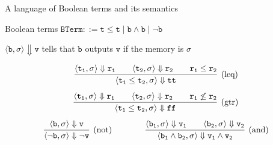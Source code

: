 \documentclass{beamer}
\begin{document}
\begin{frame}{A language of Boolean terms and its semantics}

        \begin{block}{Boolean terms}
        $\mathtt{BTerm} ::= \mathtt{t \leq t} \mid \mathtt{b \wedge b}
        \mid \mathtt{\neg b}$
	\end{block}
        $\langle \mathtt{b},\sigma \rangle \Downarrow
        \mathtt{v}$ tells that $\mathtt{b}$ outputs
        $\mathtt{v}$ if the memory is $\sigma$

        \[
                \infer[(\text{leq})]
                { 
                        \langle \mathtt{t_1 \leq t_2}, \sigma \rangle \Downarrow \mathtt{tt} 
                }
                {
                        \langle \mathtt{t_1}, \sigma \rangle \Downarrow \mathtt{r_1} \qquad
                        \langle \mathtt{t_2}, \sigma \rangle \Downarrow \mathtt{r_2}
                        \qquad \mathtt{r_1 \leq r_2}
                } 
        \] 
        \vspace{0.1cm}
        \[
                \infer[(\text{gtr})]
                { 
                        \langle \mathtt{t_1 \leq t_2}, \sigma \rangle \Downarrow \mathtt{ff} 
                }
                {
                        \langle \mathtt{t_1}, \sigma \rangle \Downarrow \mathtt{r_1} \qquad
                        \langle \mathtt{t_2}, \sigma \rangle \Downarrow \mathtt{r_2}
                        \qquad \mathtt{r_1 \not \leq r_2}
                }
        \]
        \vspace{0.1cm}
        \[        
                \infer[(\text{not})]{  
                        \langle \mathtt{\neg \mathtt{b}}, \sigma \rangle \Downarrow 
                        \mathtt{\neg v}
                        }{
                        \langle \mathtt{b}, \sigma \rangle \Downarrow \mathtt{v}
                } \qquad \qquad
                \infer[(\text{and})]{  
                        \langle \mathtt{b_1} \wedge \mathtt{b_2}, \sigma \rangle \Downarrow 
                        \mathtt{v_1 \wedge v_2}
                        }{
                        \langle \mathtt{b_1}, \sigma \rangle \Downarrow \mathtt{v_1} \qquad
                        \langle \mathtt{b_2}, \sigma \rangle \Downarrow \mathtt{v_2}
                }
        \]
\end{frame}        
\end{document}

